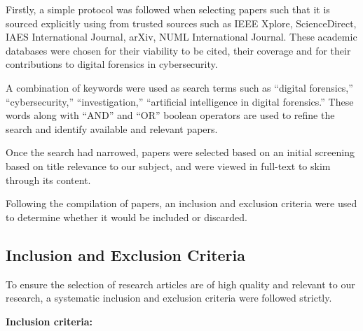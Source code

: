 \documentclass[12pt,a4paper]{article}
\begin{document}
\begin{justify}
Firstly, a simple protocol was followed when selecting papers such that it is sourced explicitly using from trusted sources such as IEEE Xplore, ScienceDirect, IAES International Journal, arXiv, NUML International Journal. These academic databases were chosen for their viability to be cited, their coverage and for their contributions to digital forensics in cybersecurity. 

A combination of keywords were used as search terms such as “digital forensics,” “cybersecurity,” “investigation,” “artificial intelligence in digital forensics.” These words along with “AND” and “OR” boolean operators are used to refine the search and identify available and relevant papers. 

Once the search had narrowed, papers were selected based on an initial screening based on title relevance to our subject, and were viewed in full-text to skim through its content. 

Following the compilation of papers, an inclusion and exclusion criteria were used to determine whether it would be included or discarded.



\subsection{Inclusion and Exclusion Criteria}

To ensure the selection of research articles are of high quality and relevant to our research, a systematic inclusion and exclusion criteria were followed strictly.

\textbf{Inclusion criteria:}


\end{justify}
\end{document}
